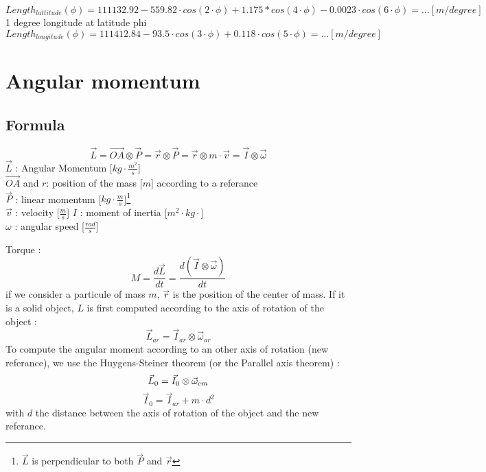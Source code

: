 \documentclass[12pt,a4paper]{article}
\begin{document}
\begin{equation}
	Length_{lattitude}(\phi) = 111132.92-559.82 \cdot cos(2 \cdot \phi)+1.175*cos(4 \cdot \phi)-0.0023 \cdot cos(6 \cdot \phi)= ... [m/degree]
\end{equation}
1 degree longitude at latitude phi
\begin{equation}
	Length_{longitude}(\phi) =
	111412.84-93.5 \cdot cos(3 \cdot \phi)+ 0.118 \cdot cos(5 \cdot \phi)= ... [m/degree]
\end{equation}


\section{Angular momentum}

\subsection{Formula}
\begin{equation}
\vec{L}=\vec{OA} \otimes \vec{P}=\vec{r} \otimes \vec{P}=\vec{r} \otimes m \cdot \vec{v}=\vec{I} \otimes \vec{\omega}
\end{equation}
$\vec{L}$ : Angular Momentum [$kg \cdot \frac{m^2}{s}$]\\
$\vec{OA}$ and $r$: position of the mass [$m$] according to a referance\\
$\vec{P}$ : linear momentum [$kg\cdot \frac{m}{s}$]\footnote{$\vec{L}$ is perpendicular to both $\vec{P}$ and $\vec{r}$}\\
$\vec{v}$ : velocity [$\frac{m}{s}$]
$I$ : moment of inertia [$m^2 \cdot kg \cdot$]\\
$\omega$ : angular speed [$\frac{rad}{s}$]

Torque : 
\begin{equation}
M = \frac{d\vec{L}}{dt}=\frac{d(\vec{I} \otimes \vec{\omega})}{dt}
\end{equation}
\medbreak
if we consider a particule of mass $m$, $\vec{r}$ is the position of the center of mass.
If it is a solid object, $L$ is first computed according to the axis of rotation of the object : 
\begin{equation}
\vec{L}_{ar}=\vec{I}_{ar} \otimes \vec{\omega}_{ar}
\end{equation}
To compute the angular moment according to an other axis of rotation (new referance), we use the Huygens-Steiner theorem (or the Parallel axis theorem) : 
\begin{equation}
\vec{L}_{0}=\vec{I}_{0} \otimes \vec{\omega}_{cm}\\
\end{equation}
\begin{equation}
\vec{I}_{0} = \vec{I}_{ar} + m\cdot d^2
\end{equation}
with $d$ the distance between the axis of rotation of the object and the new referance. 
\end{document}
